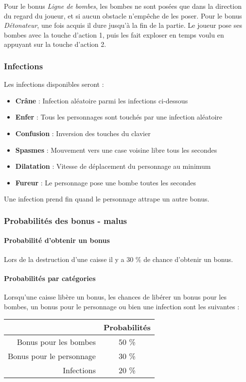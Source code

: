 Pour le bonus \emph{Ligne de bombes}, les bombes ne sont posées que dans la direction du regard du joueur, et si aucun obstacle n'empêche de les poser. Pour le bonus \emph{Détonateur}, une fois acquis il dure jusqu'à la fin de la partie. Le joueur pose ses bombes avec la touche d'action 1, puis les fait exploser en temps voulu en appuyant sur la touche d'action 2.

\subsubsection{Infections}

Les infections disponibles seront :
\begin{itemize}
\item \textbf{Crâne} : Infection aléatoire parmi les infections ci-dessous
\item \textbf{Enfer} : Tous les personnages sont touchés par une infection aléatoire
\item \textbf{Confusion} : Inversion des touches du clavier
\item \textbf{Spasmes} : Mouvement vers une case voisine libre tous les \nbSecondes secondes
\item \textbf{Dilatation} : Vitesse de déplacement du personnage au minimum
\item \textbf{Fureur} : Le personnage pose une bombe toutes les \nbSecondes secondes
\end{itemize}

Une infection prend fin quand le personnage attrape un autre bonus.

\subsubsection{Probabilités des bonus - malus}

\paragraph{Probabilité d'obtenir un bonus}
Lors de la destruction d'une caisse il y a 30 \% de chance d'obtenir un bonus.

\paragraph{Probabilités par catégories}
Lorsqu'une caisse libère un bonus, les chances de libérer un bonus pour les bombes, un bonus pour le personnage ou bien une infection sont les suivantes :
\begin{center}
\begin{tabular}{|r|c|}
\hline 
& Probabilités \\ 
\hline 
Bonus pour les bombes & 50 \% \\ 
\hline 
Bonus pour le personnage & 30 \% \\ 
\hline 
Infections & 20 \% \\ 
\hline 
\end{tabular} 
\end{center}

